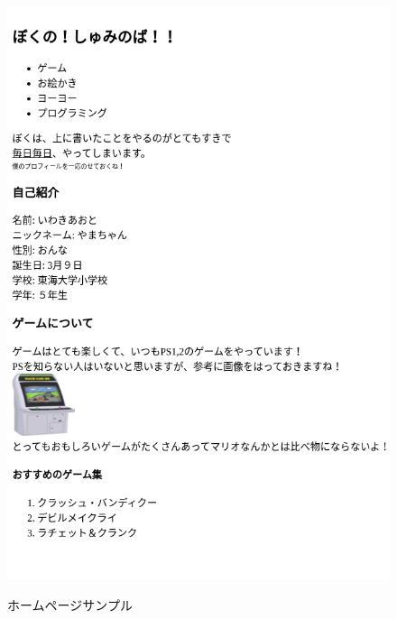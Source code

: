 \begin{figure}[h]
  \centering
  \begin{minipage}{0.45\textwidth}
    {\upshape
      \includegraphics[width=0.9\linewidth]{text01-img/textbook-img209.png}
      \caption{ホームページサンプル}\label{fig:48}
    }
  \end{minipage}
  \begin{minipage}{0.45\textwidth}
    {\upshape
}
\end{minipage}
\end{figure}
